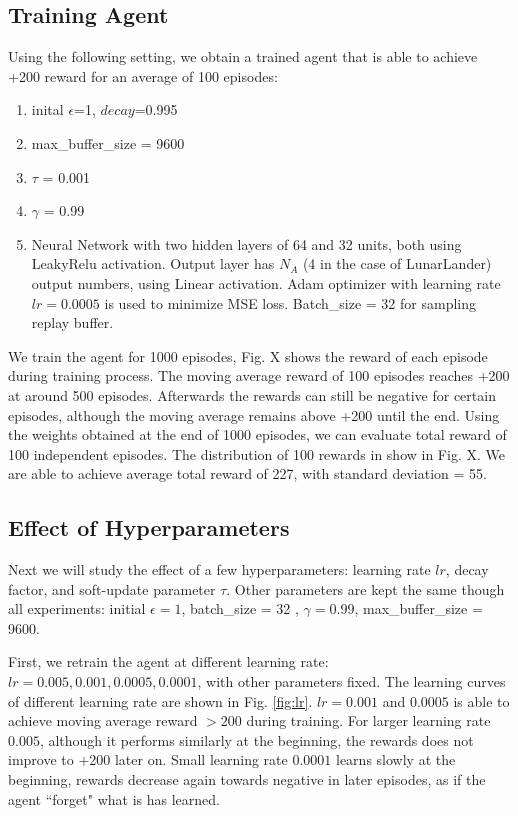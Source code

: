 \documentclass[conference]{IEEEtran}
\begin{document}
\subsection{Training Agent}
Using the following setting, we obtain a trained agent that is able to achieve +200 reward for an average of 100 episodes:
\begin{enumerate}
\item inital $\epsilon$=1, $decay$=0.995
\item max\_buffer\_size = 9600
\item $\tau$ = 0.001
\item $\gamma$ = 0.99
\item Neural Network with two hidden layers of 64 and 32 units, both using LeakyRelu activation. Output layer has $N_A$ (4 in the case of LunarLander) output numbers, using Linear activation. Adam optimizer with learning rate $lr=0.0005$ is used to minimize MSE loss. Batch\_size = 32 for sampling replay buffer.
\end{enumerate}
We train the agent for 1000 episodes, Fig. X shows the reward of each episode during training process. The moving average reward of 100 episodes reaches +200 at around 500 episodes. Afterwards the rewards can still be negative for certain episodes, although the moving average remains above +200 until the end. Using the weights obtained at the end of 1000 episodes, we can evaluate total reward of 100 independent episodes. The distribution of 100 rewards in show in Fig. X. We are able to achieve average total reward of 227, with standard deviation = 55.

\subsection{Effect of Hyperparameters}
Next we will study the effect of a few hyperparameters: learning rate $lr$, decay factor, and soft-update parameter $\tau$. Other parameters are kept the same though all experiments: initial $\epsilon=1$, batch\_size = 32 , $\gamma=0.99$, max\_buffer\_size = 9600.

First, we retrain the agent at different learning rate: $lr = 0.005, 0.001, 0.0005, 0.0001$, with other parameters fixed. The learning curves of different learning rate are shown in Fig. \ref{fig:lr}. $lr = 0.001$ and $0.0005$ is able to achieve moving average reward $>200$ during training. For larger learning rate $0.005$, although it performs similarly at the beginning, the rewards does not improve to +200 later on. Small learning rate $0.0001$ learns slowly at the beginning, rewards decrease again towards negative in later episodes, as if the agent ``forget" what is has learned. 
\end{document}
